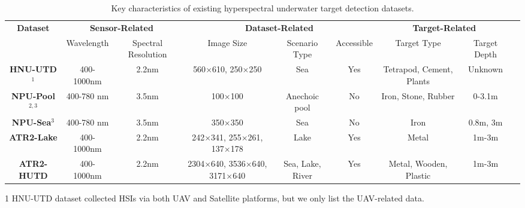 \begin{table*}[!t] 
    \centering
    \renewcommand{\arraystretch}{2}
    \setlength{\tabcolsep}{1.9mm}
    \caption{Key characteristics of existing hyperspectral underwater target detection datasets.} \label{dataset}
    \begin{threeparttable}
    \scalebox{0.9}
    {   
        \begin{tabular}{ccccccccc}
            \toprule
            \multirow{2}{*}{\textbf{Dataset}} & \multicolumn{2}{c}{\cellcolor{tablecolor1}\textbf{Sensor-Related}} & \multicolumn{3}{c}{\cellcolor{tablecolor2}\textbf{Dataset-Related}}                                               & \multicolumn{2}{c}{\cellcolor{tablecolor3}\textbf{Target-Related}}       \\ \cmidrule(lr){2-3} \cmidrule(lr){4-6} \cmidrule(lr){7-8}
                                     & Wavelength  & Spectral Resolution  & Image Size                   & Scenario Type    & Accessible & Target Type               & Target Depth \\ \midrule
            \textbf{HNU-UTD}$^1$                  & 400-1000nm  & 2.2nm    & 560$\times$610, 250$\times$250   & Sea              & Yes        & Tetrapod, Cement, Plants & Unknown      \\
            \textbf{NPU-Pool}$^{2,3}$                 & 400-780 nm  & 3.5nm                & 100$\times$100                      & Anechoic pool    & No         & Iron, Stone, Rubber       & 0-3.1m       \\
            \textbf{NPU-Sea}$^3 $                  & 400-780 nm  & 3.5nm                & 350$\times$350                      & Sea              & No         & Iron                      & 0.8m, 3m     \\
            \textbf{ATR2-Lake}               & 400-1000nm  & 2.2nm               & 242$\times$341, 255$\times$261, 137$\times$178    & Lake             & Yes        & Metal                     & 1m-3m        \\
            \rowcolor{tablecolor5!50}\textbf{ATR2-HUTD}                & 400-1000nm  & 2.2nm               & 2304$\times$640, 3536$\times$640, 3171$\times$640 & Sea, Lake, River & Yes        & Metal, Wooden, Plastic    & 1m-3m       \\ \bottomrule
            \end{tabular}
    }
    \begin{tablenotes}
        \item[1] HNU-UTD dataset collected HSIs via both UAV and Satellite platforms, but we only list the UAV-related data. 

\end{tablenotes}
\end{threeparttable}
\end{table*}
